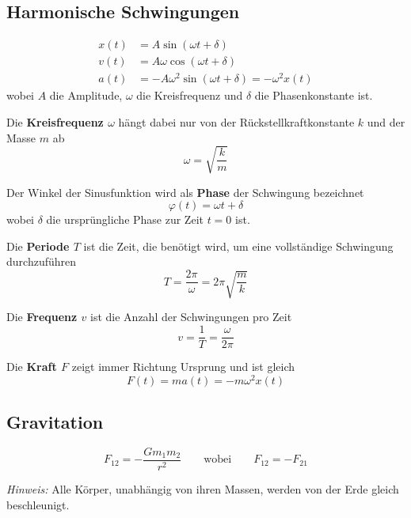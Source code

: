 \documentclass[7pt]{article}
\begin{document}
\begin{multicols*}{3}
\subsection{Harmonische Schwingungen}

\begin{equation*}
\begin{split}
	x(t) & = A\sin(\omega t+\delta)\\
	v(t) & = A\omega\cos(\omega t + \delta)\\
	a(t) & = -A\omega^2\sin(\omega t+\delta) = -\omega^2x(t)
\end{split}
\end{equation*}
wobei $A$ die Amplitude, $\omega$ die Kreisfrequenz und $\delta$ die Phasenkonstante ist.
\newline

Die \textbf{Kreisfrequenz $\omega$} hängt dabei nur von der Rückstellkraftkonstante $k$ und der Masse $m$ ab
\begin{equation*}
	\omega = \sqrt{\frac{k}{m}}
\end{equation*}

Der Winkel der Sinusfunktion wird als \textbf{Phase} der Schwingung bezeichnet
\begin{equation*}
	\varphi(t) = \omega t + \delta
\end{equation*}
wobei $\delta$ die ursprüngliche Phase zur Zeit $t = 0$ ist. \newline

Die \textbf{Periode $T$} ist die Zeit, die benötigt wird, um eine vollständige Schwingung durchzuführen
\begin{equation*}
	T = \frac{2\pi}{\omega} = 2\pi\sqrt{\frac{m}{k}}
\end{equation*} 

Die \textbf{Frequenz $v$} ist die Anzahl der Schwingungen pro Zeit
\begin{equation*}
	v = \frac{1}{T} = \frac{\omega}{2\pi}
\end{equation*}

Die \textbf{Kraft $F$} zeigt immer Richtung Ursprung und ist gleich
\begin{equation*}
	F(t) = ma(t) = -m\omega^2x(t)
\end{equation*}

\subsection{Gravitation}

\begin{equation*}
	F_{12} = -\frac{Gm_1m_2}{r^2}\qquad\text{wobei}\qquad F_{12} = -F_{21}
\end{equation*}

\emph{Hinweis:} Alle Körper, unabhängig von ihren Massen, werden von der Erde gleich beschleunigt.

\end{multicols*}
\end{document}
